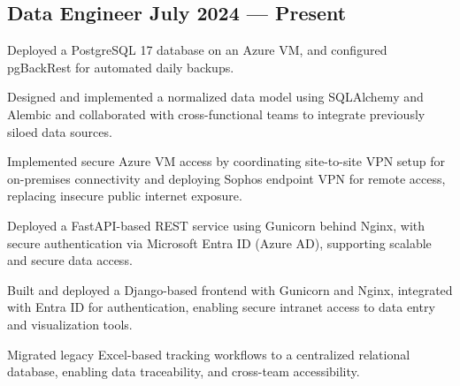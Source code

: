 \subsection{{Data Engineer  \hfill July 2024 --- Present}}
\begin{zitemize}
\item Deployed a PostgreSQL 17 database on an Azure VM, and configured pgBackRest for automated daily backups.
\item Designed and implemented a normalized data model using SQLAlchemy and Alembic and collaborated with cross-functional teams to integrate previously siloed data sources.
\item Implemented secure Azure VM access by coordinating site-to-site VPN setup for on-premises connectivity and deploying Sophos endpoint VPN for remote access, replacing insecure public internet exposure.
\item Deployed a FastAPI-based REST service using Gunicorn behind Nginx, with secure authentication via Microsoft Entra ID (Azure AD), supporting scalable and secure data access.
\item Built and deployed a Django-based frontend with Gunicorn and Nginx, integrated with Entra ID for authentication, enabling secure intranet access to data entry and visualization tools.
\item Migrated legacy Excel-based tracking workflows to a centralized relational database, enabling data traceability, and cross-team accessibility.
\end{zitemize}

